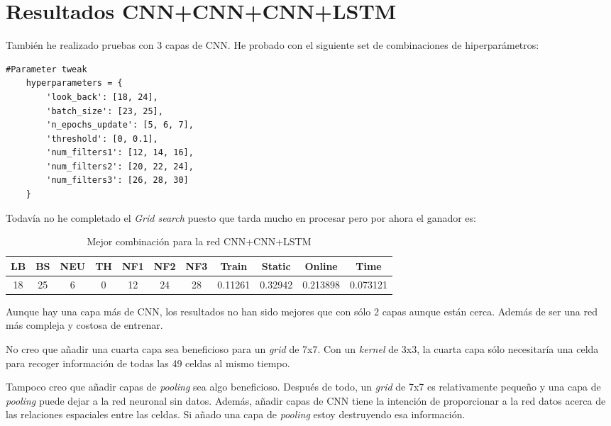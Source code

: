 \documentclass{article}
\begin{document}
\section{Resultados CNN+CNN+CNN+LSTM}
También he realizado pruebas con 3 capas de CNN. He probado con el siguiente set de combinaciones de hiperparámetros:

\begin{lstlisting}[style=pythonstyle, caption={Grid Search CNN+CNN+CNN+LSTM}]
	#Parameter tweak
	hyperparameters = {
		'look_back': [18, 24],
		'batch_size': [23, 25],
		'n_epochs_update': [5, 6, 7],
		'threshold': [0, 0.1],
		'num_filters1': [12, 14, 16],
		'num_filters2': [20, 22, 24],
		'num_filters3': [26, 28, 30]
	}
\end{lstlisting}

Todavía no he completado el \textit{Grid search} puesto que tarda mucho en procesar pero por ahora el ganador es:

\begin{table}[h]
	\centering
	\caption{Mejor combinación para la red CNN+CNN+LSTM}
	\begin{tabular}{ccccccccccc}
		\toprule
		\textbf{LB} & \textbf{BS} & \textbf{NEU} & \textbf{TH} & \textbf{NF1} & \textbf{NF2} & \textbf{NF3} & \textbf{Train} & \textbf{Static} & \textbf{Online} & \textbf{Time} \\
		\midrule
		18 & 25 & 6 & 0 & 12 & 24 & 28 & 0.11261 & 0.32942 & 0.213898 & 0.073121\\
		\bottomrule
	\end{tabular}
\end{table}

Aunque hay una capa más de CNN, los resultados no han sido mejores que con sólo 2 capas aunque están cerca. Además de ser una red más compleja y costosa de entrenar.

No creo que añadir una cuarta capa sea beneficioso para un \textit{grid} de 7x7.  Con un \textit{kernel} de 3x3, la cuarta capa sólo necesitaría una celda para recoger información de todas las 49 celdas al mismo tiempo.

Tampoco creo que añadir capas de \textit{pooling} sea algo beneficioso. Después de todo, un \textit{grid} de 7x7 es relativamente pequeño y una capa de \textit{pooling} puede dejar a la red neuronal sin datos. Además, añadir capas de CNN tiene la intención de proporcionar a la red datos acerca de las relaciones espaciales entre las celdas. Si añado una capa de \textit{pooling} estoy destruyendo esa información.
\end{document}
